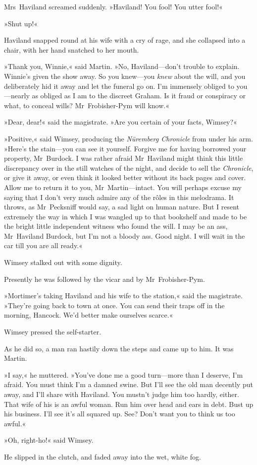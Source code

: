 Mrs~Haviland screamed suddenly. »Haviland! You fool! You utter fool!«

»Shut up!«

Haviland snapped round at his wife with a cry of rage, and she collapsed into a chair, with her hand snatched to her mouth.

»Thank you, Winnie,« said Martin. »No, Haviland—don't trouble to explain. Winnie's given the show away. So you knew—you \textit{knew} about the will, and you deliberately hid it away and let the funeral go on. I'm immensely obliged to you—nearly as obliged as I am to the discreet Graham. Is it fraud or conspiracy or what, to conceal wills? Mr~Frobisher-Pym will know.«

»Dear, dear!« said the magistrate. »Are you certain of your facts, Wimsey?«

»Positive,« said Wimsey, producing the \textit{Nüremberg Chronicle} from under his arm. »Here's the stain—you can see it yourself. Forgive me for having borrowed your property, Mr~Burdock. I was rather afraid Mr~Haviland might think this little discrepancy over in the still watches of the night, and decide to sell the \textit{Chronicle}, or give it away, or even think it looked better without its back pages and cover. Allow me to return it to you, Mr~Martin—intact. You will perhaps excuse my saying that I don't very much admire any of the rôles in this melodrama. It throws, as Mr~Pecksniff would say, a sad light on human nature. But I resent extremely the way in which I was wangled up to that bookshelf and made to be the bright little independent witness who found the will. I may be an ass, Mr~Haviland Burdock, but I'm not a bloody ass. Good night. I will wait in the car till you are all ready.«

Wimsey stalked out with some dignity.

Presently he was followed by the vicar and by Mr~Frobisher-Pym.

»Mortimer's taking Haviland and his wife to the station,« said the magistrate. »They're going back to town at once. You can send their traps off in the morning, Hancock. We'd better make ourselves scarce.«

Wimsey pressed the self-starter.

As he did so, a man ran hastily down the steps and came up to him. It was Martin.

»I say,« he muttered. »You've done me a good turn—more than I deserve, I'm afraid. You must think I'm a damned swine. But I'll see the old man decently put away, and I'll share with Haviland. You mustn't judge him too hardly, either. That wife of his is an awful woman. Run him over head and ears in debt. Bust up his business. I'll see it's all squared up. See? Don't want you to think us too awful.«

»Oh, right-ho!« said Wimsey.

He slipped in the clutch, and faded away into the wet, white fog.